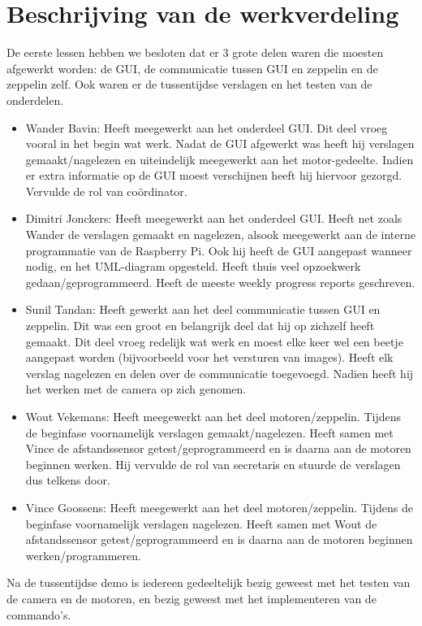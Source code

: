 \documentclass[eind]{penoverslag}
\begin{document}
\section{Beschrijving van de werkverdeling}
De eerste lessen hebben we besloten dat er 3 grote delen waren die moesten afgewerkt worden: de GUI, de communicatie tussen GUI en zeppelin en de zeppelin zelf. Ook waren er de tussentijdse verslagen en het testen van de onderdelen. \\
\begin{itemize}
\item Wander Bavin: Heeft meegewerkt aan het onderdeel GUI. Dit deel vroeg vooral in het begin wat werk. Nadat de GUI afgewerkt was heeft hij verslagen gemaakt/nagelezen en uiteindelijk meegewerkt aan het motor-gedeelte. Indien er extra informatie op de GUI moest verschijnen heeft hij hiervoor gezorgd. Vervulde de rol van co\"ordinator.
\item Dimitri Jonckers: Heeft meegewerkt aan het onderdeel GUI. Heeft net zoals Wander de verslagen gemaakt en nagelezen, alsook meegewerkt aan de interne programmatie van de Raspberry Pi. Ook hij heeft de GUI aangepast wanneer nodig, en het UML-diagram opgesteld. Heeft thuis veel opzoekwerk gedaan/geprogrammeerd. Heeft de meeste weekly progress reports geschreven.
\item Sunil Tandan: Heeft gewerkt aan het deel communicatie tussen GUI en zeppelin. Dit was een groot en belangrijk deel dat hij op zichzelf heeft gemaakt. Dit deel vroeg redelijk wat werk en moest elke keer wel een beetje aangepast worden (bijvoorbeeld voor het versturen van images). Heeft elk verslag nagelezen en delen over de communicatie toegevoegd. Nadien heeft hij het werken met de camera op zich genomen.
\item Wout Vekemans: Heeft meegewerkt aan het deel motoren/zeppelin. Tijdens de beginfase voornamelijk verslagen gemaakt/nagelezen. Heeft samen met Vince de afstandssensor getest/geprogrammeerd en is daarna aan de motoren beginnen werken. Hij vervulde de rol van secretaris en stuurde de verslagen dus telkens door.
\item Vince Goossens: Heeft meegewerkt aan het deel motoren/zeppelin. Tijdens de beginfase voornamelijk verslagen nagelezen. Heeft samen met Wout de afstandssensor getest/geprogrammeerd en is daarna aan de motoren beginnen werken/programmeren.
\end{itemize}

Na de tussentijdse demo is iedereen gedeeltelijk bezig geweest met het testen van de camera en de motoren, en bezig geweest met het implementeren van de commando's.
\end{document}
